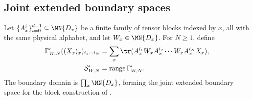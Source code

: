 
\subsection{Joint extended boundary spaces}

\begin{definition}
    \label{def:mpo_joint_inserted_boundary}
    \leanok
    Let $\{A_x^i\}_{i=0}^{d-1}\subseteq\MN{D_x}$ be a finite family of
    tensor blocks indexed by $x$, all with the same physical alphabet,
    and let $W_x\in\MN{D_x}$. For $N\geq1$, define
    \begin{align}
        \Gamma'_{W,N}((X_x)_x)_{i_1\cdots i_N}
                          & =\sum_x\tr(A_x^{i_1}W_xA_x^{i_2}\cdots W_xA_x^{i_N}X_x),
        \label{eq:mpo_joint_inserted_map}                                            \\
        \mathcal S'_{W,N} & =\operatorname{range}\Gamma'_{W,N}.
    \end{align}
    The boundary domain is $\prod_x\MN{D_x}$, forming the joint extended
    boundary space for the block construction of
    \cite[Section~5]{GarreRubio2023MPOSym}.
\end{definition}

